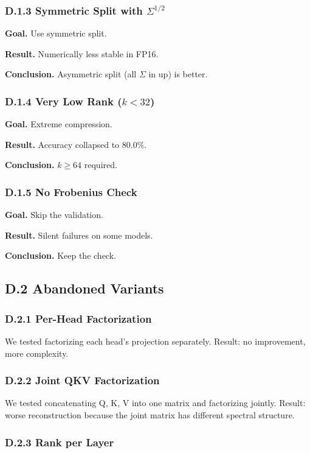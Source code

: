 \subsubsection{D.1.3 Symmetric Split with $\Sigma^{1/2}$}

\textbf{Goal.} Use symmetric split.

\textbf{Result.} Numerically less stable in FP16.

\textbf{Conclusion.} Asymmetric split (all $\Sigma$ in up) is better.

\subsubsection{D.1.4 Very Low Rank ($k < 32$)}

\textbf{Goal.} Extreme compression.

\textbf{Result.} Accuracy collapsed to 80.0\%.

\textbf{Conclusion.} $k \geq 64$ required.

\subsubsection{D.1.5 No Frobenius Check}

\textbf{Goal.} Skip the validation.

\textbf{Result.} Silent failures on some models.

\textbf{Conclusion.} Keep the check.

\subsection{D.2 Abandoned Variants}

\subsubsection{D.2.1 Per-Head Factorization}

We tested factorizing each head's projection separately. Result: no 
improvement, more complexity.

\subsubsection{D.2.2 Joint QKV Factorization}

We tested concatenating Q, K, V into one matrix and factorizing jointly. 
Result: worse reconstruction because the joint matrix has different spectral 
structure.

\subsubsection{D.2.3 Rank per Layer}


